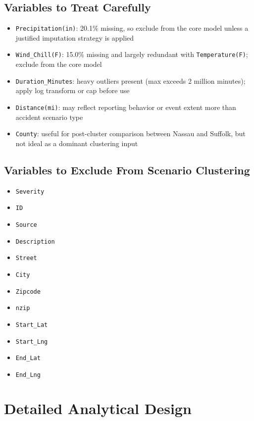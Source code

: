\documentclass[11pt]{article}
\begin{document}
\subsection{Variables to Treat Carefully}

\begin{itemize}
\item \texttt{Precipitation(in)}: 20.1\% missing, so exclude from the core model unless a justified imputation strategy is applied
\item \texttt{Wind\_Chill(F)}: 15.0\% missing and largely redundant with \texttt{Temperature(F)}; exclude from the core model
\item \texttt{Duration\_Minutes}: heavy outliers present (max exceeds 2 million minutes); apply log transform or cap before use
\item \texttt{Distance(mi)}: may reflect reporting behavior or event extent more than accident scenario type
\item \texttt{County}: useful for post-cluster comparison between Nassau and Suffolk, but not ideal as a dominant clustering input
\end{itemize}

\subsection{Variables to Exclude From Scenario Clustering}

\begin{itemize}
\item \texttt{Severity}
\item \texttt{ID}
\item \texttt{Source}
\item \texttt{Description}
\item \texttt{Street}
\item \texttt{City}
\item \texttt{Zipcode}
\item \texttt{nzip}
\item \texttt{Start\_Lat}
\item \texttt{Start\_Lng}
\item \texttt{End\_Lat}
\item \texttt{End\_Lng}
\end{itemize}

\section{Detailed Analytical Design}
\end{document}
